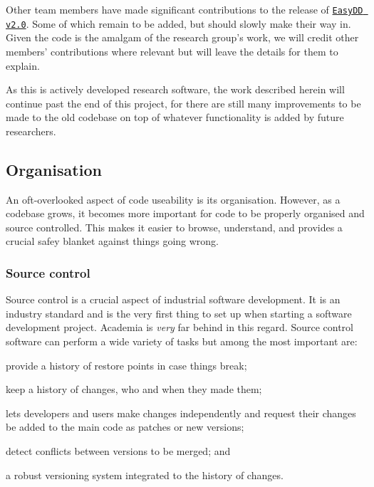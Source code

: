 Other team members have made significant contributions to the release of \href{https://github.com/TarletonGroup/EasyDD}{\texttt{EasyDD v2.0}}. Some of which remain to be added, but should slowly make their way in. Given the code is the amalgam of the research group's work, we will credit other members' contributions where relevant but will leave the details for them to explain.

As this is actively developed research software, the work described herein will continue past the end of this project, for there are still many improvements to be made to the old codebase on top of whatever functionality is added by future researchers.

\subsection{Organisation}

An oft-overlooked aspect of code useability is its organisation. However, as a codebase grows, it becomes more important for code to be properly organised and source controlled. This makes it easier to browse, understand, and provides a crucial safey blanket against things going wrong.

\subsubsection{Source control}

Source control is a crucial aspect of industrial software development. It is an industry standard and is the very first thing to set up when starting a software development project. Academia is \emph{very} far behind in this regard. Source control software can perform a wide variety of tasks but among the most important are:
\begin{inparaenum}
    \item provide a history of restore points in case things break;
    \item keep a history of changes, who and when they made them;
    \item lets developers and users make changes independently and request their changes be added to the main code as patches or new versions;
    \item detect conflicts between versions to be merged; and
    \item a robust versioning system integrated to the history of changes.
\end{inparaenum}


